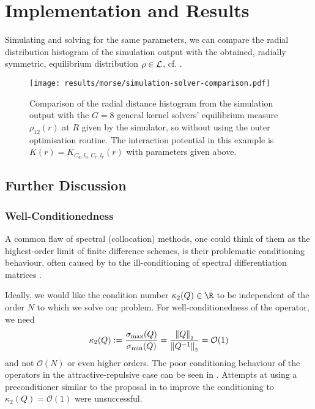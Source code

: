 \chapter{Implementation and Results}
\label{chap:implementation-and-results}

Simulating and solving for the same parameters, we can compare the radial distribution histogram of the simulation output with the obtained, radially symmetric, equilibrium distribution $\rho \in \mathcal{L}$, cf. .


\begin{figure}[H]
  \centering
  \texttt{[image: results/morse/simulation-solver-comparison.pdf]}
  \caption[Comparison of histogram and spectral method solution]{Comparison of the radial distance histogram from the simulation output with the $G = 8$ general kernel solvers' equilibrium measure $\rho_{12}(r)$ at $R$ given by the simulator, so without using the outer optimisation routine. The interaction potential in this example is $K(r) = K_{C_a, l_a, C_r, l_r}(r)$ with parameters given above.}
  \label{fig:simulation-solver-comparison}
\end{figure}

\section{Further Discussion}
\subsection{Well-Conditionedness}
A common flaw of spectral (collocation) methods, one could think of them as the highest-order limit of finite difference schemes, is their problematic conditioning behaviour, often caused by to the ill-conditioning of spectral differentiation matrices \parencite{2019-atap}.

Ideally, we would like the condition number $\kappa_2(Q) \in \R$ to be independent of the order $N$ to which we solve our problem.
For well-conditionedness of the operator, we need
$$\kappa_2(Q) := \frac{\sigma_{\rm max}(Q)}{\sigma_{\rm min}(Q)} = \frac{\left\lVert Q\right\rVert_{\scriptscriptstyle 2}}{\left\lVert Q^{-1}\right\rVert_{\scriptscriptstyle 2}} = \mathcal{O}(1)$$
and not $\mathcal{O}(N)$ or even higher orders.
The poor conditioning behaviour of the operators in the attractive-repulsive case can be seen in .
Attempts at using a preconditioner similar to the proposal in \cite{2013-a-fast-and-well-conditioned-spectral-method} to improve the conditioning to $\kappa_2(Q) = \mathcal{O}(1)$ were unsuccessful.

